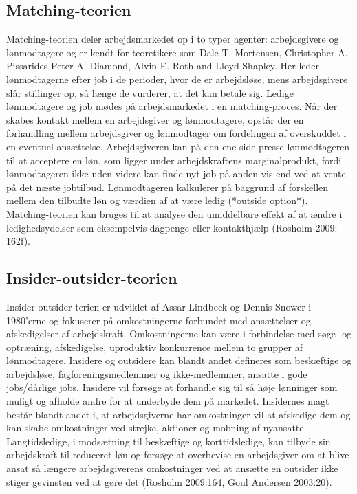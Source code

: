 \subsection{Matching-teorien \label{}}
Matching-teorien deler arbejdsmarkedet op i to typer agenter: arbejdsgivere og lønmodtagere og er kendt for teoretikere som Dale T. Mortensen, Christopher A. Pissarides Peter A. Diamond, Alvin E. Roth and Lloyd Shapley. Her leder lønmodtagerne efter job i de perioder, hvor de er arbejdsløse, mens arbejdsgivere slår stillinger op, så længe de vurderer, at det kan betale sig. Ledige lønmodtagere og job mødes på arbejdsmarkedet i en matching-proces. Når der skabes kontakt mellem en arbejdsgiver og lønmodtagere, opstår der en forhandling mellem arbejdsgiver og lønmodtager om fordelingen af overskuddet i en eventuel ansættelse. Arbejdsgiveren kan på den ene side presse lønmodtageren til at acceptere en løn, som ligger under arbejdskraftens marginalprodukt, fordi lønmodtageren ikke uden videre kan finde nyt job på anden vis end ved at vente på det næste jobtilbud. Lønmodtageren kalkulerer på baggrund af forskellen mellem den tilbudte løn og værdien af at være ledig (*outside option*). Matching-teorien kan bruges til at analyse den umiddelbare effekt af at ændre i ledighedsydelser som eksempelvis dagpenge eller kontakthjælp (Rosholm 2009: 162f).

\subsection{Insider-outsider-teorien \label{}}
Insider-outsider-terien er udviklet af Assar Lindbeck og Dennis Snower i 1980'erne og fokuserer på omkostningerne forbundet med ansættelser og afskedigelser af arbejdskraft. Omkostningerne kan være i forbindelse med søge- og optræning, afskedigelse, uproduktiv konkurrence mellem to grupper af lønmodtagere. Insidere og outsidere kan blandt andet defineres som beskæftige og arbejdsløse, fagforeningsmedlemmer og ikke-medlemmer, ansatte i gode jobs/dårlige jobs. Insidere vil forsøge at forhandle sig til så høje lønninger som muligt og afholde andre for at underbyde dem på markedet. Insidernes magt består blandt andet i, at arbejdsgiverne har omkostninger vil at afskedige dem og kan skabe omkostninger ved strejke, aktioner og mobning af nyansatte. Langtidsledige, i modsætning til beskæftige og korttidsledige, kan tilbyde sin arbejdskraft til reduceret løn og forsøge at overbevise en arbejdsgiver om at blive ansat så længere arbejdsgiverens omkostninger ved at ansætte en outsider ikke stiger gevinsten ved at gøre det (Rosholm 2009:164, Goul Andersen 2003:20).



